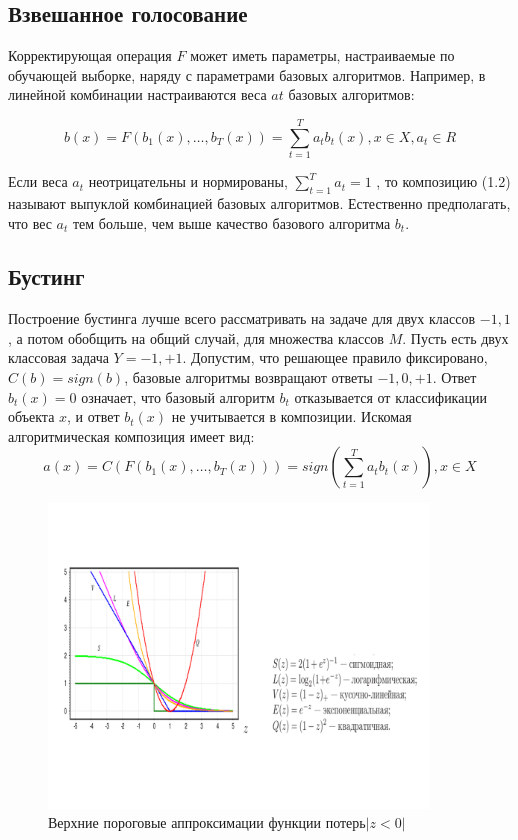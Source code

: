 \subsection{Взвешанное голосование}

Корректирующая операция $F$ может иметь параметры, настраиваемые по обучающей выборке, наряду с параметрами базовых алгоритмов. Например, в линейной комбинации настраиваются веса $at$ базовых алгоритмов:

\begin{equation}
	b(x)=F(b_1(x), \dotsc ,b_T(x)) = \sum_{t=1}^{T} a_tb_t(x),  x \in X,  a_t \in R
\end{equation}

Если веса $a_t$ неотрицательны и нормированы, $\sum_{t=1}^{T} a_t =1$ , то композицию (1.2) называют выпуклой комбинацией базовых алгоритмов. Естественно предполагать, что вес $a_t$ тем больше, чем выше качество базового алгоритма $b_t$.

\subsection{Бустинг}

Построение бустинга лучше всего рассматривать на задаче для двух классов ${-1,1}$, а потом обобщить на общий случай, для множества классов $M$. Пусть есть двух классовая задача $Y={-1,+1}$. Допустим, что решающее правило фиксировано, $C(b) = sign(b)$, базовые алгоритмы возвращают ответы $-1,0,+1$. Ответ $b_t(x) = 0$ означает, что базовый алгоритм $b_t$ отказывается от классификации объекта $x$, и ответ $b_t(x)$ не учитывается в композиции.
Искомая алгоритмическая композиция имеет вид:
\begin{equation}
	a(x)=C(F(b_1(x),\dotsc,b_T(x)))=sign(\sum_{t=1}^{T} a_tb_t(x)), x \in X
\end{equation}

\begin{figure}
  \includegraphics[width=0.9\textwidth]{images/upper_approximations.png}
  \caption{Верхние пороговые аппроксимации функции потерь$|z<0|$\label{upper-approximations}}
\end{figure}

